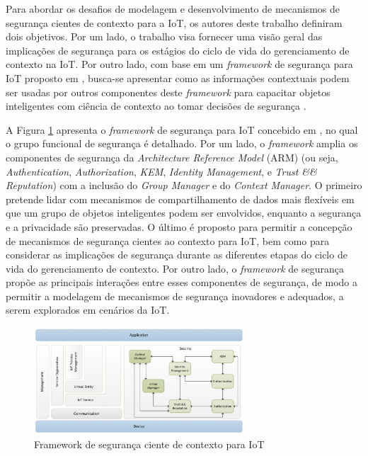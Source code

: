 \documentclass[tid,table]{texufpel} %
\begin{document}
Para abordar os desafios de modelagem e desenvolvimento de mecanismos de segurança cientes de contexto para a IoT, os autores deste trabalho definiram dois objetivos. Por um lado, o trabalho visa fornecer uma visão geral das implicações de segurança para os estágios do ciclo de vida do gerenciamento de contexto na IoT. Por outro lado, com base em um \textit{framework} de segurança para IoT proposto em \cite{bernabe14}, busca-se apresentar como as informações contextuais podem ser usadas por outros componentes deste \textit{framework} para capacitar objetos inteligentes com ciência de contexto ao tomar decisões de segurança \cite{ramos15}.


A Figura \ref{arm-framework} apresenta o \textit{framework} de segurança para IoT concebido em \cite{bernabe14}, no qual o grupo funcional de segurança é detalhado. Por um lado, o \textit{framework} amplia os componentes de segurança da \textit{Architecture Reference Model} (ARM) (ou seja, \textit{Authentication}, \textit{Authorization}, \textit{KEM}, \textit{Identity Management}, e \textit{Trust \&\& Reputation}) com a inclusão do \textit{Group Manager} e do \textit{Context Manager}. O primeiro pretende lidar com mecanismos de compartilhamento de dados mais flexíveis em que um grupo de objetos inteligentes podem ser envolvidos, enquanto a segurança e a privacidade são preservadas. O último é proposto para permitir a concepção de mecanismos de segurança cientes ao contexto para IoT, bem como para considerar as implicações de segurança durante as diferentes etapas do ciclo de vida do gerenciamento de contexto. Por outro lado, o \textit{framework} de segurança propõe as principais interações entre esses componentes de segurança, de modo a permitir a modelagem de mecanismos de segurança inovadores e adequados, a serem explorados em cenários da IoT.


\begin{figure}[ht]
\centering
\includegraphics[width=0.7\textwidth]{imagens/arm-framework.png}
\caption{Framework de segurança ciente de contexto para IoT}
\label{arm-framework}
\end{figure}
\end{document}
